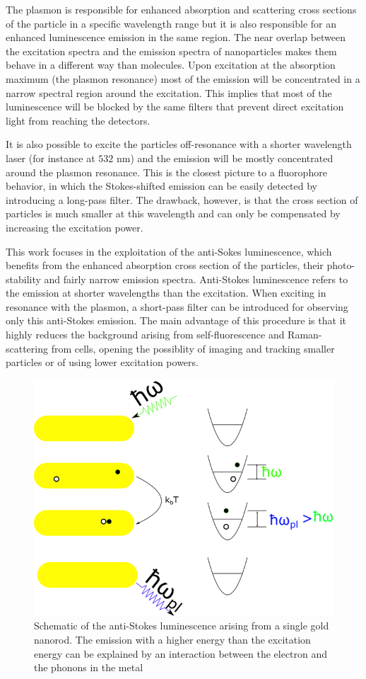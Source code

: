 \documentclass[journal=nalefd,manuscript=letter]{achemso}
\newcommand{\nm}{\ensuremath{\,\textrm{nm}}}
\begin{document}
The plasmon is responsible for enhanced absorption and scattering cross sections
of the particle in a specific wavelength range but it is also responsible for an
enhanced luminescence emission in the same region. The near overlap between the
excitation spectra and the emission spectra of nanoparticles makes them behave
in a different way than molecules. Upon excitation at the absorption maximum
(the plasmon resonance) most of the emission will be concentrated in a narrow
spectral region around the excitation. This implies that most of the
luminescence will be blocked by the same filters that prevent direct excitation
light from reaching the detectors.

It is also possible to excite the particles off-resonance with a
shorter wavelength laser (for instance at $532\,\nm$) and the emission will be
mostly concentrated around the plasmon resonance. This is the closest picture
to a fluorophore behavior, in which the Stokes-shifted emission can be easily
detected by introducing a long-pass filter. The drawback, however, is that the
cross section of particles is much smaller at this wavelength and can only
be compensated by increasing the excitation power. 

This work focuses in the exploitation of the anti-Sokes luminescence, which
benefits from the enhanced absorption cross section of the particles, their
photo-stability and fairly narrow emission spectra. Anti-Stokes luminescence
refers to the emission at shorter wavelengths than the excitation. When exciting
in resonance with the plasmon, a short-pass filter can be introduced for
observing only this anti-Stokes emission. The main advantage of this procedure
is that it highly reduces the background arising from self-fluorescence
and Raman-scattering from cells, opening the possiblity of imaging and tracking
smaller particles or of using lower excitation powers.

\begin{figure}[htp]
\centering
	\includegraphics[width=0.4\linewidth]{Figures/luminescence_all_AS.png}
	\caption{Schematic of the anti-Stokes luminescence arising from a single gold
	nanorod. The emission with a higher energy than the excitation energy can be
	explained by an interaction between the electron and the phonons in the metal}
	\label{fig:anti-Stokes-process}
\end{figure}
\end{document}
